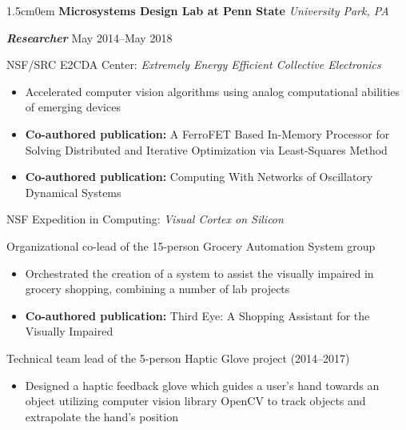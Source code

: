 \documentclass[letterpaper]{article}
\newcommand{\primaryindent}{1.5cm} %
\newcommand{\resumesubsection}[1]{
	\vspace{1.5ex}
	\noindent \large \textsf{{#1}}\par
	\vspace{.5ex}
	\normalsize
}
\newenvironment{indented}{\begin{adjustwidth}{\primaryindent}{0em}}{\end{adjustwidth}}
\newenvironment{resumelist}{\begin{itemize}[topsep=0pt,noitemsep,itemindent=-15pt,leftmargin=30pt]}{\end{itemize}}
\newcommand{\generalentry}[5]{
	\begin{indented}
		\Large \textsf{\textbf{#1}} \hfill	%
			\hfill\normalsize\textit{#2} \par  			%
		\noindent \large \textsf{\textbf{\textit{#3}}} 	%
			\hfill \normalsize #4\par 					%
		\normalsize \normalfont #5 \par					%
		\normalsize \normalfont
	\end{indented}
	}
\begin{document}
\generalentry{Microsystems Design Lab at Penn State}{University Park, PA}{Researcher}{May 2014--May 2018}{		
	
	\resumesubsection{NSF/SRC E2CDA Center: \textit{Extremely Energy Efficient Collective Electronics}}
	\begin{resumelist}
		\item Accelerated computer vision algorithms using analog computational abilities of emerging devices
		\item\textbf{Co-authored publication:} A FerroFET Based In-Memory Processor for Solving Distributed and Iterative Optimization via Least-Squares Method \cite{ferrofet}
		\item\textbf{Co-authored publication:} Computing With Networks of Oscillatory Dynamical Systems \cite{8565896}
	\end{resumelist}
	
	\resumesubsection{NSF Expedition in Computing: \textit{Visual Cortex on Silicon}}
	
	Organizational co-lead of the 15-person Grocery Automation System group
	\begin{resumelist}
		\item Orchestrated the creation of a system to assist the visually impaired in grocery shopping, combining a number of lab projects
		\item\textbf{Co-authored publication:} Third Eye: A Shopping Assistant for the Visually Impaired \cite{7842859}
	\end{resumelist}
	
	\vspace{1mm}
	
	Technical team lead of the 5-person Haptic Glove project (2014--2017)
	\begin{resumelist}
		\item Designed a haptic feedback glove which guides a user's hand towards an object utilizing computer vision library OpenCV to track objects and extrapolate the hand's position
	\end{resumelist}


}
\end{document}
